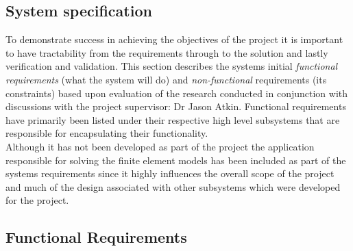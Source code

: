 \subsection{System specification}
To demonstrate success in achieving the objectives of the project it is important to have tractability from the requirements through to the solution and lastly verification and validation. This section describes the systems initial \textit{functional requirements} (what the system will do) and \textit{non-functional} requirements (its constraints) based upon evaluation of the research conducted in conjunction with discussions with the project supervisor: Dr Jason Atkin. Functional requirements have primarily been listed under their respective high level subsystems that are responsible for encapsulating their functionality. \\ 

\noindent
Although it has not been developed as part of the project the application responsible for solving the finite element models has been included as part of the systems requirements since it highly influences the overall scope of the project and much of the design associated with other subsystems which were developed for the project. \\ 

\subsection{Functional Requirements}

